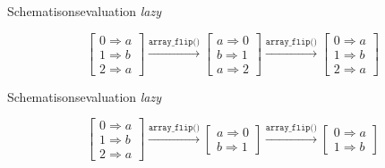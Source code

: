 \begin{frame}{Schematisons}{evaluation \textit{lazy}}
    \begin{center}
            \[
            \left[ \begin{array}{tt}
                0 \Rightarrow a \\
                1 \Rightarrow b \\
                2 \Rightarrow a
            \end{array} \right]
            \xrightarrow{\texttt{array\_flip()}}
            \left[ \begin{array}{tt}
                a \Rightarrow 0 \\
                b \Rightarrow 1 \\
                a \Rightarrow 2
            \end{array} \right]
            \xrightarrow{\texttt{array\_flip()}}
            \left[ \begin{array}{tt}
                0 \Rightarrow a \\
                1 \Rightarrow b \\
                2 \Rightarrow a
            \end{array} \right]
            \]%
    \end{center}
\end{frame}

\begin{frame}{Schematisons}{evaluation \textit{lazy}}
    \begin{center}
            \[
            \left[ \begin{array}{tt}
                0 \Rightarrow a \\
                1 \Rightarrow b \\
                2 \Rightarrow a
            \end{array} \right]
            \xrightarrow{\texttt{array\_flip()}}
            \left[ \begin{array}{tt}
                a \Rightarrow 0 \\
                b \Rightarrow 1
            \end{array} \right]
            \xrightarrow{\texttt{array\_flip()}}
            \left[ \begin{array}{tt}
                0 \Rightarrow a \\
                1 \Rightarrow b
            \end{array} \right]
            \]%
    \end{center}
\end{frame}
